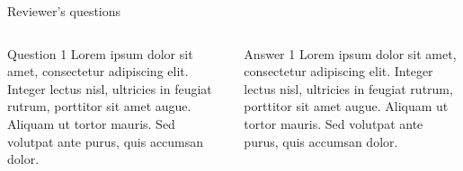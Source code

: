 \documentclass[aspectratio=1610]{beamer}
\begin{document}
\begin{frame}{Reviewer's questions}
\begin{columns}
\begin{exampleblock}{Question 1}
Lorem ipsum dolor sit amet, consectetur adipiscing elit. Integer lectus nisl, ultricies in feugiat rutrum, porttitor sit amet augue. Aliquam ut tortor mauris. Sed volutpat ante purus, quis accumsan dolor.
\end{exampleblock}

\begin{block}{Answer 1}
Lorem ipsum dolor sit amet, consectetur adipiscing elit. Integer lectus nisl, ultricies in feugiat rutrum, porttitor sit amet augue. Aliquam ut tortor mauris. Sed volutpat ante purus, quis accumsan dolor.
\end{block}
\end{columns}
\end{frame}

\end{document}

